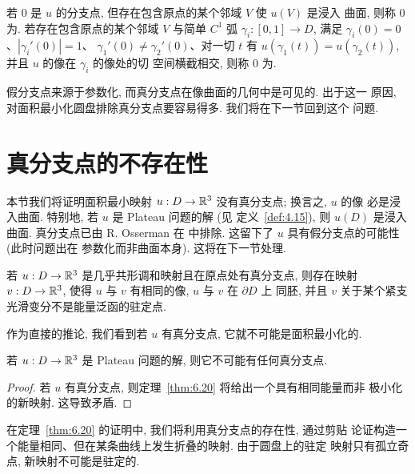 \begin{definition}
\label{def:6.19}
若 $0$ 是 $u$ 的分支点, 但存在包含原点的某个邻域 $V$ 使 $u(V)$ 是浸入
曲面, 则称 $0$ 为. 若存在包含原点的某个邻域 $V$ 与简单
$C^1$ 弧 $\gamma_i:[0,1]\to D$, 满足 $\gamma_i(0)=0$、$|\gamma_i'(0)|=1$、
$\gamma_1'(0)\neq\gamma_2'(0)$、对一切 $t$ 有
$u(\gamma_1(t))=u(\gamma_2(t))$, 并且 $u$ 的像在 $\gamma_i$ 的像处的切
空间横截相交, 则称 $0$ 为.
\end{definition}

假分支点来源于参数化, 而真分支点在像曲面的几何中是可见的. 出于这一
原因, 对面积最小化圆盘排除真分支点要容易得多. 我们将在下一节回到这个
问题.

\section{真分支点的不存在性}
\label{sec:6.3}

本节我们将证明面积最小映射 $u:D\to\mathbb{R}^3$ 没有真分支点; 换言之, $u$ 的像
必是浸入曲面. 特别地, 若 $u$ 是 Plateau 问题的解 (见
定义~\ref{def:4.15}), 则 $u(D)$ 是浸入曲面. 真分支点已由 R. Osserman 在
\cite{Os1} 中排除. 这留下了 $u$ 具有假分支点的可能性 (此时问题出在
参数化而非曲面本身). 这将在下一节处理.

\begin{theorem}
\label{thm:6.20}
若 $u:D\to\mathbb{R}^3$ 是几乎共形调和映射且在原点处有真分支点, 则存在映射
$v:D\to\mathbb{R}^3$, 使得 $u$ 与 $v$ 有相同的像, $u$ 与 $v$ 在 $\partial D$ 上
同胚, 并且 $v$ 关于某个紧支光滑变分不是能量泛函的驻定点.
\end{theorem}

作为直接的推论, 我们看到若 $u$ 有真分支点, 它就不可能是面积最小化的.

\begin{corollary}
\label{cor:6.21}
若 $u:D\to\mathbb{R}^3$ 是 Plateau 问题的解, 则它不可能有任何真分支点.
\end{corollary}

\begin{proof}
若 $u$ 有真分支点, 则定理~\ref{thm:6.20} 将给出一个具有相同能量而非
极小化的新映射. 这导致矛盾.
\end{proof}

在定理~\ref{thm:6.20} 的证明中, 我们将利用真分支点的存在性, 通过剪贴
论证构造一个能量相同、但在某条曲线上发生折叠的映射. 由于圆盘上的驻定
映射只有孤立奇点, 新映射不可能是驻定的.

